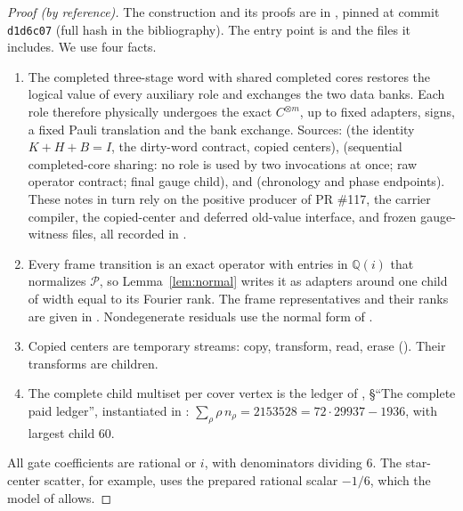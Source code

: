 \documentclass[11pt]{article}
\theoremstyle{definition}
\begin{document}
\begin{proof}[Proof (by reference)]
The construction and its proofs are in \cite{cms}, pinned at commit
\texttt{d1d6c07} (full hash in the bibliography). The entry point is
 and the files it includes. We use four facts.
\begin{enumerate}
\item The completed three-stage word with shared completed cores restores the
  logical value of every auxiliary role and exchanges the two data banks. Each
  role therefore physically undergoes the exact $C^{\otimes m}$, up to fixed
  adapters, signs, a fixed Pauli translation and the bank exchange. Sources:
   (the identity $K+H+B=I$, the
  dirty-word contract, copied centers), 
  (sequential completed-core sharing: no role is used by two invocations at
  once; raw operator contract; final gauge child), and
   (chronology and phase endpoints).
  These notes in turn rely on the positive producer of PR \#117, the carrier
  compiler, the copied-center and deferred old-value interface, and frozen
  gauge-witness files, all recorded in \cite{cms}.
\item Every frame transition is an exact operator with entries in
  $\mathbb Q(i)$ that normalizes $\mathcal P$, so Lemma~\ref{lem:normal} writes
  it as adapters around one child of width equal to its Fourier rank. The
  frame representatives and their ranks are given in
  . Nondegenerate residuals use the
  normal form of .
\item Copied centers are temporary streams: copy, transform, read, erase
  (). Their transforms are children.
\item The complete child multiset per cover vertex is the ledger of
  , \S``The complete paid ledger'',
  instantiated in :
  $\sum_\rho\rho\,n_\rho=2153528=72\cdot29937-1936$, with largest child $60$.
\end{enumerate}
All gate coefficients are rational or $i$, with denominators dividing $6$.
The star-center scatter, for example, uses the prepared rational scalar $-1/6$,
which the model of \cite[\S1.1]{oai-dft} allows.


\end{proof}
\end{document}
